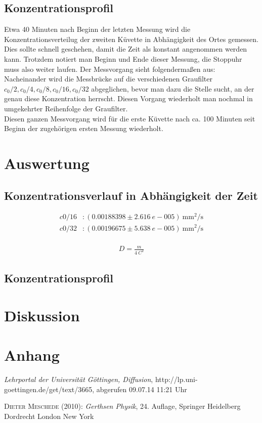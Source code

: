 \documentclass[12pt,a4paper,titlepage,headinclude,bibtotoc]{scrartcl}
\begin{document}
\subsection{Konzentrationsprofil}
Etwa 40 Minuten nach Beginn der letzten Messung wird die Konzentrationsverteilug der zweiten Küvette in Abhängigkeit des Ortes gemessen.
Dies sollte schnell geschehen, damit die Zeit als konstant angenommen werden kann.
Trotzdem notiert man Beginn und Ende dieser Messung, die Stoppuhr muss also weiter laufen.
Der Messvorgang sieht folgendermaßen aus:
Nacheinander wird die Messbrücke auf die verschiedenen Graufilter $c_0/2, c_0/4, c_0/8, c_0/16, c_0/32$ abgeglichen, bevor man dazu die Stelle sucht, an der genau diese Konzentration herrscht.
Diesen Vorgang wiederholt man nochmal in umgekehrter Reihenfolge der Graufilter.\\
Diesen ganzen Messvorgang wird für die erste Küvette nach ca. 100 Minuten  seit Beginn der zugehörigen ersten Messung wiederholt. 

\section{Auswertung}
\label{sec:auswertung}
\subsection{Konzentrationsverlauf in Abhängigkeit der Zeit}


\begin{align*}
	c0/16&: (0.00188398 \pm 2.616~e-005)~\si{\milli \meter ^2 / \second}\\
	c0/32&: (0.00196675 \pm 5.638~e-005) ~\si{\milli \meter ^2 / \second}\\
\end{align*}

\begin{align}
	D=\frac{m}{4~C^2}	
\end{align}

\subsection{Konzentrationsprofil}


\section{Diskussion}
\label{sec:diskussion}

\section{Anhang}

\begin{thebibliography}{100}

	\emph{Lehrportal der Universität Göttingen, Diffusion},
  http://lp.uni-goettingen.de/get/text/3665, abgerufen 09.07.14 11:21 Uhr

	\textsc{Dieter Meschede} (2010): \emph{Gerthsen Physik}, 24. Auflage, Springer Heidelberg
Dordrecht London New York

\end{thebibliography}
\end{document}
